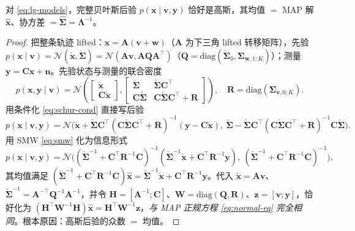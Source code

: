 \begin{theorem}[线性高斯下 MAP $=$ 贝叶斯后验均值]\label{thm:map-bayes}
对 \cref{eq:lg-models}，完整贝叶斯后验 $p(\mathbf{x}\mid\mathbf{v},\mathbf{y})$ 恰好是高斯，其均值 $=$ MAP 解 $\hat{\mathbf{x}}$、协方差 $=\hat{\boldsymbol{\Sigma}}=\boldsymbol{\Lambda}^{-1}$。
\end{theorem}
\begin{proof}
把整条轨迹 lifted：$\mathbf{x}=\mathbf{A}(\mathbf{v}+\mathbf{w})$（$\mathbf{A}$ 为下三角 lifted 转移矩阵），先验 $p(\mathbf{x}\mid\mathbf{v})=\mathcal{N}(\check{\mathbf{x}},\check{\boldsymbol{\Sigma}})=\mathcal{N}(\mathbf{A}\mathbf{v},\mathbf{A}\mathbf{Q}\mathbf{A}^\top)$（$\mathbf{Q}=\mathrm{diag}(\check{\boldsymbol{\Sigma}}_0,\boldsymbol{\Sigma}_{\mathbf{w},1:K})$）；测量 $\mathbf{y}=\mathbf{C}\mathbf{x}+\mathbf{n}$。先验状态与测量的联合密度
\[
  p(\mathbf{x},\mathbf{y}\mid\mathbf{v})=\mathcal{N}\!\left(\begin{bmatrix}\check{\mathbf{x}}\\\mathbf{C}\check{\mathbf{x}}\end{bmatrix},
  \begin{bmatrix}\check{\boldsymbol{\Sigma}}&\check{\boldsymbol{\Sigma}}\mathbf{C}^\top\\\mathbf{C}\check{\boldsymbol{\Sigma}}&\mathbf{C}\check{\boldsymbol{\Sigma}}\mathbf{C}^\top+\mathbf{R}\end{bmatrix}\right),\quad \mathbf{R}=\mathrm{diag}(\boldsymbol{\Sigma}_{\mathbf{v},0:K}).
\]
用条件化 \cref{eq:schur-cond} 直接写后验
\[
  p(\mathbf{x}\mid\mathbf{v},\mathbf{y})=\mathcal{N}\Big(\check{\mathbf{x}}+\check{\boldsymbol{\Sigma}}\mathbf{C}^\top(\mathbf{C}\check{\boldsymbol{\Sigma}}\mathbf{C}^\top+\mathbf{R})^{-1}(\mathbf{y}-\mathbf{C}\check{\mathbf{x}}),\ \check{\boldsymbol{\Sigma}}-\check{\boldsymbol{\Sigma}}\mathbf{C}^\top(\mathbf{C}\check{\boldsymbol{\Sigma}}\mathbf{C}^\top+\mathbf{R})^{-1}\mathbf{C}\check{\boldsymbol{\Sigma}}\Big).
\]
用 SMW \cref{eq:smw} 化为信息形式
\[
  p(\mathbf{x}\mid\mathbf{v},\mathbf{y})=\mathcal{N}\Big((\check{\boldsymbol{\Sigma}}^{-1}+\mathbf{C}^\top\mathbf{R}^{-1}\mathbf{C})^{-1}(\check{\boldsymbol{\Sigma}}^{-1}\check{\mathbf{x}}+\mathbf{C}^\top\mathbf{R}^{-1}\mathbf{y}),\ (\check{\boldsymbol{\Sigma}}^{-1}+\mathbf{C}^\top\mathbf{R}^{-1}\mathbf{C})^{-1}\Big),
\]
其均值满足 $(\check{\boldsymbol{\Sigma}}^{-1}+\mathbf{C}^\top\mathbf{R}^{-1}\mathbf{C})\hat{\mathbf{x}}=\check{\boldsymbol{\Sigma}}^{-1}\check{\mathbf{x}}+\mathbf{C}^\top\mathbf{R}^{-1}\mathbf{y}$。代入 $\check{\mathbf{x}}=\mathbf{A}\mathbf{v}$、$\check{\boldsymbol{\Sigma}}^{-1}=\mathbf{A}^{-\top}\mathbf{Q}^{-1}\mathbf{A}^{-1}$，并令 $\mathbf{H}=[\mathbf{A}^{-1};\mathbf{C}]$、$\mathbf{W}=\mathrm{diag}(\mathbf{Q},\mathbf{R})$、$\mathbf{z}=[\mathbf{v};\mathbf{y}]$，恰好化为 $(\mathbf{H}^\top\mathbf{W}^{-1}\mathbf{H})\hat{\mathbf{x}}=\mathbf{H}^\top\mathbf{W}^{-1}\mathbf{z}$，\emph{与 MAP 正规方程 \cref{eq:normal-eq} 完全相同}。根本原因：高斯后验的众数 $=$ 均值。
\end{proof}

